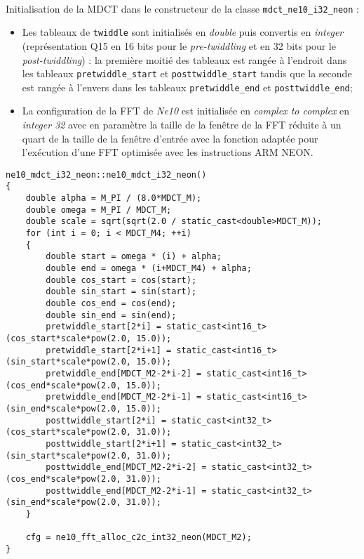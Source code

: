 \documentclass{article}
\begin{document}
\paragraph{}
Initialisation de la MDCT dans le constructeur de la classe \texttt{mdct\_ne10\_i32\_neon} :
\begin{itemize}
    \item Les tableaux de \texttt{twiddle} sont initialisés en \emph{double} puis convertis en \emph{integer} (représentation Q15 en 16 bits pour le \emph{pre-twiddling} et en 32 bits pour le \emph{post-twiddling}) : la première moitié des tableaux est rangée à l'endroit dans les tableaux \texttt{pretwiddle\_start} et \texttt{posttwiddle\_start} tandis que la seconde est rangée à l'envers dans les tableaux \texttt{pretwiddle\_end} et \texttt{posttwiddle\_end};
    \item La configuration de la FFT de \emph{Ne10} est initialisée en \emph{complex to complex} en \emph{integer 32} avec en paramètre la taille de la fenêtre de la FFT réduite à un quart de la taille de la fenêtre d'entrée avec la fonction adaptée pour l'exécution d'une FFT optimisée avec les instructions ARM NEON.
\end{itemize}
\lstset{language=C++}
\begin{lstlisting}
ne10_mdct_i32_neon::ne10_mdct_i32_neon()
{
    double alpha = M_PI / (8.0*MDCT_M);
    double omega = M_PI / MDCT_M;
    double scale = sqrt(sqrt(2.0 / static_cast<double>MDCT_M));
    for (int i = 0; i < MDCT_M4; ++i)
    {
        double start = omega * (i) + alpha;
        double end = omega * (i+MDCT_M4) + alpha;
        double cos_start = cos(start);
        double sin_start = sin(start);
        double cos_end = cos(end);
        double sin_end = sin(end);
        pretwiddle_start[2*i] = static_cast<int16_t>(cos_start*scale*pow(2.0, 15.0));
        pretwiddle_start[2*i+1] = static_cast<int16_t>(sin_start*scale*pow(2.0, 15.0));
        pretwiddle_end[MDCT_M2-2*i-2] = static_cast<int16_t>(cos_end*scale*pow(2.0, 15.0));
        pretwiddle_end[MDCT_M2-2*i-1] = static_cast<int16_t>(sin_end*scale*pow(2.0, 15.0));
        posttwiddle_start[2*i] = static_cast<int32_t>(cos_start*scale*pow(2.0, 31.0));
        posttwiddle_start[2*i+1] = static_cast<int32_t>(sin_start*scale*pow(2.0, 31.0));
        posttwiddle_end[MDCT_M2-2*i-2] = static_cast<int32_t>(cos_end*scale*pow(2.0, 31.0));
        posttwiddle_end[MDCT_M2-2*i-1] = static_cast<int32_t>(sin_end*scale*pow(2.0, 31.0));
    }

    cfg = ne10_fft_alloc_c2c_int32_neon(MDCT_M2);
}
\end{lstlisting}
\end{document}

